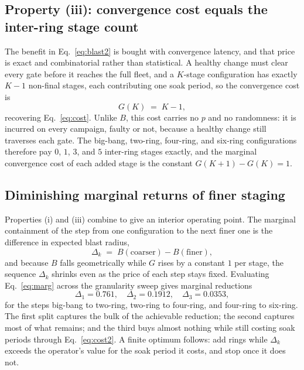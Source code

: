 \documentclass[journal]{IEEEtran}
\begin{document}
\subsection{Property (iii): convergence cost equals the inter-ring stage count}
The benefit in Eq.~\eqref{eq:blast2} is bought with convergence latency, and that price is exact and
combinatorial rather than statistical. A healthy change must clear every gate before it reaches the
full fleet, and a $K$-stage configuration has exactly $K-1$ non-final stages, each contributing one
soak period, so the convergence cost is
\begin{equation}
G(K) \;=\; K - 1,
\label{eq:cost2}
\end{equation}
recovering Eq.~\eqref{eq:cost}. Unlike $B$, this cost carries no $p$ and no randomness: it is incurred
on every campaign, faulty or not, because a healthy change still traverses each gate. The big-bang,
two-ring, four-ring, and six-ring configurations therefore pay $0$, $1$, $3$, and $5$ inter-ring
stages exactly, and the marginal convergence cost of each added stage is the constant $G(K+1) - G(K)
= 1$.

\subsection{Diminishing marginal returns of finer staging}
Properties (i) and (iii) combine to give an interior operating point. The marginal containment of the
step from one configuration to the next finer one is the difference in expected blast radius,
\begin{equation}
\Delta_k \;=\; B(\text{coarser}) - B(\text{finer}),
\label{eq:marg}
\end{equation}
and because $B$ falls geometrically while $G$ rises by a constant $1$ per stage, the sequence
$\Delta_k$ shrinks even as the price of each step stays fixed. Evaluating Eq.~\eqref{eq:marg} across
the granularity sweep gives marginal reductions
\begin{equation}
\Delta_1 = 0.761, \quad \Delta_2 = 0.1912, \quad \Delta_3 = 0.0353,
\label{eq:margvals}
\end{equation}
for the steps big-bang to two-ring, two-ring to four-ring, and four-ring to six-ring. The first split
captures the bulk of the achievable reduction; the second captures most of what remains; and the
third buys almost nothing while still costing soak periods through Eq.~\eqref{eq:cost2}. A finite optimum
follows: add rings while $\Delta_k$ exceeds the operator's value for the soak period it costs, and
stop once it does not.
\end{document}
